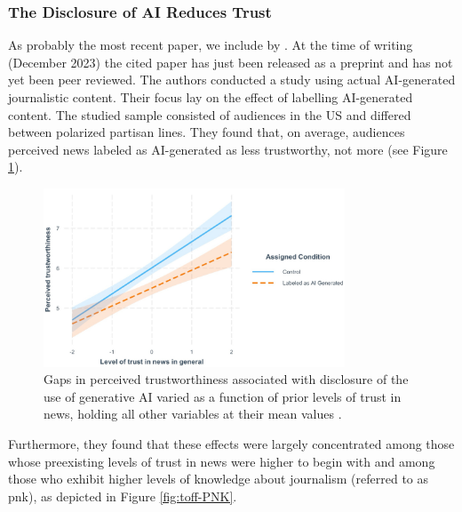 \documentclass[
  a4paper,  %
  twoside,  %
  bibliography=totoc,
  headsepline,
  cleardoublepage=empty,
  parskip=half,
  draft=false
]{scrbook}
\begin{document}
\subsubsection*{The Disclosure of AI Reduces Trust}
As probably the most recent paper, we include  by \citeauthor{toffTheyCouldJust2023}. At the time of writing (December 2023) the cited paper has just been released as a preprint and has not yet been peer reviewed. The authors conducted a study using actual AI-generated journalistic content. Their focus lay on the effect of labelling AI-generated content. The studied sample consisted of audiences in the US and differed between polarized partisan lines. They found that, on average, audiences perceived news labeled as AI-generated as less trustworthy, not more (see Figure \ref{fig:toff-trust}). 

\begin{figure}[h]
  \centering
  \includegraphics[width=0.8\textwidth]{./graphics/toff/Trust in news.png}
  \caption{Gaps in perceived trustworthiness associated with disclosure of the use of generative AI varied as a function of prior levels of trust in news, holding all other variables at their mean values \cite{toffTheyCouldJust2023}.}
  \label{fig:toff-trust}
\end{figure}

Furthermore, they found that these effects were largely concentrated among those whose preexisting levels of trust in news were higher to begin with and among those who exhibit higher levels of knowledge about journalism (referred to as \gls{pnk}), as depicted in Figure \ref{fig:toff-PNK}.
\end{document}
